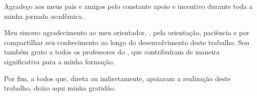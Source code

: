 
\begin{agradecimentos}[AGRADECIMENTOS]

    Agradeço aos meus pais e amigos pelo constante apoio e incentivo durante toda a minha jornada acadêmica.. 
    
    Meu sincero agradecimento ao meu orientador, \imprimirorientador, pela orientação, paciência e por compartilhar seu conhecimento ao longo do desenvolvimento deste trabalho. Sou também grato a todos os professores do \imprimirinstituicao, que contribuíram de maneira significativa para a minha formação.

    Por fim, a todos que, direta ou indiretamente, apoiaram a realização deste trabalho, deixo aqui minha gratidão.

\end{agradecimentos}
